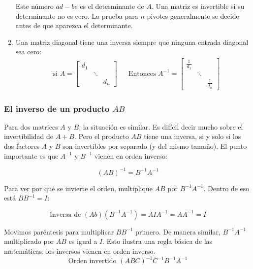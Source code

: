 \begin{enumerate}
	      Este número $ad -be$ es el determinante de $A$. Una matriz es invertible si su determinante no es
	      cero. La prueba para $n$ pivotes generalmente se decide antes de que aparezca el determinante.

	\item Una matriz diagonal tiene una inversa siempre que ninguna entrada diagonal sea cero:
	      \begin{align*}
		       & \text{si } A=\begin{bmatrix}
			                      d_1&  & \\ & \ddots  & \\ & & d_{n}
		                      \end{bmatrix} &  & \text{Entonces } A^{-1}=\begin{bmatrix}
			                                                                 \frac{1}{d_{1}} &  & \\ & \ddots  & \\ & & \frac{1}{d_{n}}
		                                                                 \end{bmatrix}
	      \end{align*}

\end{enumerate}

\subsubsection{El inverso de un producto $AB$}

Para dos matrices $A$ y $B$, la situación es similar. Es difícil decir mucho sobre el
invertibilidad de $A + B$. Pero el producto $AB$ tiene una inversa, si y solo si los dos factores
$A$ y $B$ son invertibles por separado (y del mismo tamaño). El punto importante es que $A^{-1}$ y
$B^{-1}$ vienen en orden inverso:

\begin{equation}
	\left(AB\right)^{-1}=B^{-1}A^{-1}
\end{equation}

Para ver por qué se invierte el orden, multiplique $AB$ por $B^{-1}A^{-1}$. Dentro de eso está $BB^{-1}= I$:

\begin{equation}
	\text{Inversa de } \left(Ab\right)\left(B^{-1}A^{-1} \right) =AIA^{-1}=AA^{-1}=I
\end{equation}

Movimos paréntesis para multiplicar $BB^{-1}$ primero. De manera similar, $B^{-1}A^{-1}$ multiplicado por $AB$ es igual a $I$. Esto
ilustra una regla básica de las matemáticas: los inversos vienen en orden inverso.
\begin{equation}
	\text{Orden invertido } \left(ABC\right)^{-1}C^{-1}B^{-1}A^{-1}
\end{equation}

